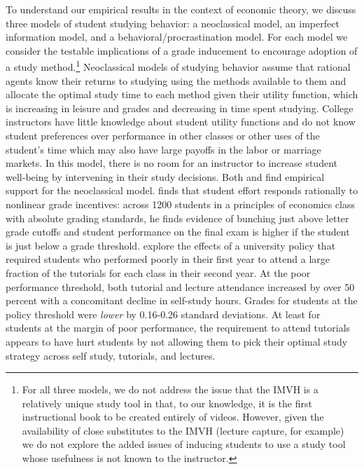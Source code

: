 \documentclass[12pt]{article}
\begin{document}
To understand our empirical results in the context of economic theory, we discuss three models of student studying behavior: a neoclassical model, an imperfect information model, and a behavioral/procrastination model. For each model we consider the testable implications of a grade inducement to encourage adoption of a study method.\footnote{For all three models, we do not address the issue that the IMVH is a relatively unique study tool in that, to our knowledge, it is the first instructional book to be created entirely of videos. However, given the availability of close substitutes to the IMVH (lecture capture, for example) we do not explore the added issues of inducing students to use a study tool whose usefulness is not known to the instructor.} Neoclassical models of studying behavior assume that rational agents know their returns to studying using the methods available to them and allocate the optimal study time to each method given their utility function, which is increasing in leisure and grades and decreasing in time spent studying. College instructors have little knowledge about student utility functions and do not know student preferences over performance in other classes or other uses of the student's time which may also have large payoffs in the labor or marriage markets. In this model, there is no room for an instructor to increase student well-being by intervening in their study decisions. Both \textcite{oettinger2002} and \textcite{kow2020} find empirical support for the neoclassical model. \textcite{oettinger2002} finds that student effort responds rationally to nonlinear grade incentives: across 1200 students in a principles of economics class with absolute grading standards, he finds evidence of bunching just above letter grade cutoffs and student performance on the final exam is higher if the student is just below a grade threshold. \textcite{kow2020} explore the effects of a university policy that required students who performed poorly in their first year to attend a large fraction of the tutorials for each class in their second year. At the poor performance threshold, both tutorial and lecture attendance increased by over 50 percent with a concomitant decline in self-study hours. Grades for students at the policy threshold were \textit{lower} by 0.16-0.26 standard deviations. At least for students at the margin of poor performance, the requirement to attend tutorials appears to have hurt students by not allowing them to pick their optimal study strategy across self study, tutorials, and lectures.
\end{document}
